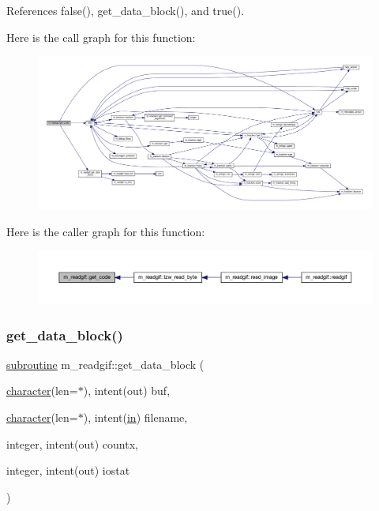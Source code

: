References false(), get\+\_\+data\+\_\+block(), and true().

Here is the call graph for this function\+:
\nopagebreak
\begin{figure}[H]
\begin{center}
\leavevmode
\includegraphics[width=350pt]{namespacem__readgif_a027fedbf7ba68763483988c1aa6d2cea_cgraph}
\end{center}
\end{figure}
Here is the caller graph for this function\+:
\nopagebreak
\begin{figure}[H]
\begin{center}
\leavevmode
\includegraphics[width=350pt]{namespacem__readgif_a027fedbf7ba68763483988c1aa6d2cea_icgraph}
\end{center}
\end{figure}
\mbox{\label{namespacem__readgif_ace6e51d0293107696bd1482348414a43}} 
\subsubsection{\texorpdfstring{get\+\_\+data\+\_\+block()}{get\_data\_block()}}
{\footnotesize\ttfamily \hyperlink{M__stopwatch_83_8txt_acfbcff50169d691ff02d4a123ed70482}{subroutine} m\+\_\+readgif\+::get\+\_\+data\+\_\+block (\begin{DoxyParamCaption}\item[{\hyperlink{option__stopwatch_83_8txt_abd4b21fbbd175834027b5224bfe97e66}{character}(len=$\ast$), intent(out)}]{buf,  }\item[{\hyperlink{option__stopwatch_83_8txt_abd4b21fbbd175834027b5224bfe97e66}{character}(len=$\ast$), intent(\hyperlink{M__journal_83_8txt_afce72651d1eed785a2132bee863b2f38}{in})}]{filename,  }\item[{integer, intent(out)}]{countx,  }\item[{integer, intent(out)}]{iostat }\end{DoxyParamCaption})\hspace{0.3cm}{\ttfamily [private]}}



